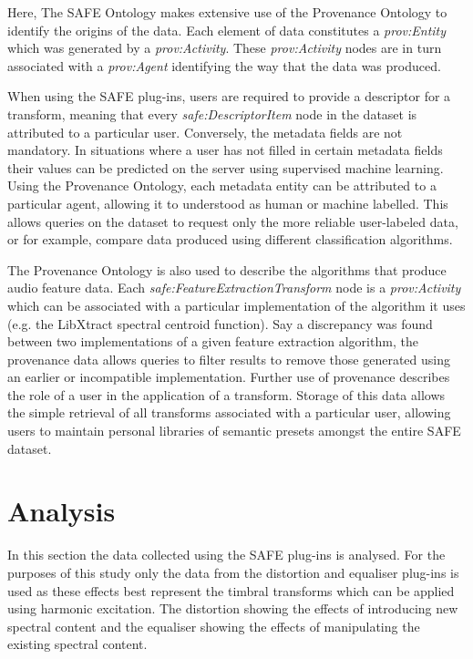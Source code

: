 		Here, The SAFE Ontology makes extensive use of the Provenance Ontology to identify the origins of the data.
		Each element of data constitutes a \emph{prov:Entity} which was generated by a \emph{prov:Activity}. These
		\emph{prov:Activity} nodes are in turn associated with a \emph{prov:Agent} identifying the way that the data
		was produced.

		When using the SAFE plug-ins, users are required to provide a descriptor for a transform, meaning that every
		\emph{safe:DescriptorItem} node in the dataset is attributed to a particular user. Conversely, the metadata
		fields are not mandatory. In situations where a user has not filled in certain metadata fields their values
		can be predicted on the server using supervised machine learning. Using the Provenance Ontology, each
		metadata entity can be attributed to a particular agent, allowing it to understood as human or machine
		labelled. This allows queries on the dataset to request only the more reliable user-labeled data, or for
		example, compare data produced using different classification algorithms.

		The Provenance Ontology is also used to describe the algorithms that produce audio feature data. Each
		\emph{safe:FeatureExtractionTransform} node is a \emph{prov:Activity} which can be associated with a
		particular implementation of the algorithm it uses (e.g. the LibXtract \citep{bullock2007libxtract} spectral
		centroid function). Say a discrepancy was found between two implementations of a given feature extraction
		algorithm, the provenance data allows queries to filter results to remove those generated using an earlier
		or incompatible implementation. Further use of provenance describes the role of a user in the application of
		a transform. Storage of this data allows the simple retrieval of all transforms associated with a particular
		user, allowing users to maintain personal libraries of semantic presets amongst the entire SAFE dataset.

\section{Analysis}
\label{sec:TimbreEvaluation-Analysis}
	In this section the data collected using the SAFE plug-ins is analysed. For the purposes of this study only the data
	from the distortion and equaliser plug-ins is used as these effects best represent the timbral transforms which can
	be applied using harmonic excitation. The distortion showing the effects of introducing new spectral content and the
	equaliser showing the effects of manipulating the existing spectral content.

